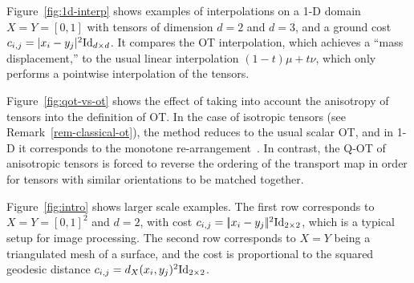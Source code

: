 Figure~\ref{fig:1d-interp} shows examples of interpolations on a 1-D domain $X=Y=[0,1]$ with tensors of dimension $d=2$ and $d=3$, and a ground cost $c_{i,j}=|x_i-y_j|^2\mathrm{Id}_{d \times d}$. It compares the OT interpolation, which achieves a ``mass displacement,'' to the usual linear interpolation $(1-t)\mu+t\nu$, which only performs a pointwise interpolation of the tensors. 

Figure~\ref{fig:qot-vs-ot} shows the effect of taking into account the anisotropy of tensors into the definition of OT. In the case of isotropic tensors (see Remark~\ref{rem-classical-ot}), the method reduces to the usual scalar OT, and in 1-D it corresponds to the monotone re-arrangement~\cite{santambrogio2015optimal}. In contrast, the Q-OT of anisotropic tensors is forced to reverse the ordering of the transport map in order for tensors with similar orientations to be matched together. 

Figure~\ref{fig:intro} shows larger scale examples. 
%
The first row corresponds to $X=Y=[0,1]^2$ and $d=2$, with cost $c_{i,j}=|\!| x_i-y_j |\!|^2\mathrm{Id}_{2 \times 2}$, which is a typical setup for image processing.
%
The second row corresponds to $X=Y$ being a triangulated mesh of a surface, and the cost is proportional to the squared geodesic distance $c_{i,j}=d_X(x_i,y_j)^2 \mathrm{Id}_{2\times 2}$. 


